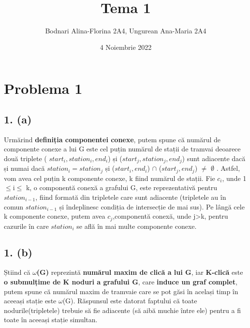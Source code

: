 \documentclass[12pt] {fphw}
\title{Tema 1} %
\author{Bodnari Alina-Florina 2A4, Ungurean Ana-Maria 2A4 } %
\date{4 Noiembrie 2022} %
\institute{Universitatea Alexandru Ioan-Cuza \\ Facultatea de Informatică} %
\begin{document}
\maketitle %


\section*{Problema 1}
\subsection*{1. (a)} 
 
Urmărind \textbf{definiția componentei conexe}, putem spune că numărul de componente conexe a lui G este cel puțin numărul de stații de tramvai deoarece două triplete ( ${}start_i, station_i, end_i$) și (${}start_j, station_j, end_j$) sunt adiacente dacă și numai dacă ${}station_i=station_j$ și (${}start_i, end_i$) $\cap$  (${}start_j, end_j$) $\neq$  $\emptyset$ . Astfel, vom avea cel puțin k componente conexe, k fiind numărul de stații.  Fie ${}c_i$, unde 1$\leq$i$\leq$ k, o componentă conexă a grafului G, este reprezentativă pentru ${}station_{i-1}$,
fiind formată din tripletele care sunt adiacente (tripletele au în comun  ${}station_{i-1}$ 
și îndeplinesc condiția de intersecție de mai sus). Pe lângă cele k componente conexe, putem avea ${}c_j$,componentă conexă, unde j>k,  pentru cazurile în care  ${}station_i$ se află în  mai multe componente conexe.  

\subsection*{1. (b)}

Știind că \textbf{ $\omega$(G)} reprezintă \textbf{numărul maxim de clică a lui G}, iar \textbf{K-clică} este \textbf{o submulțime de K noduri a grafului G}, care \textbf{induce un graf complet}, putem spune că numărul maxim de tramvaie care se pot găsi în același timp în aceeași stație este  $\omega$(G). Răspunsul este datorat faptului că toate nodurile(tripletele) trebuie să fie adiacente (să aibă muchie între ele) pentru a fi toate în aceeași stație simultan.  
\end{document}
